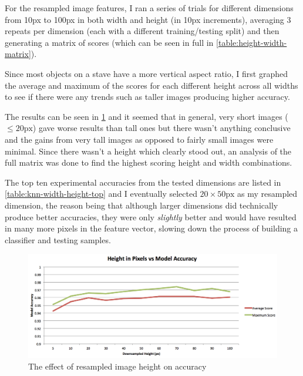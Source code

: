 For the resampled image features, I ran a series of trials for different dimensions from 10px to 100px in both width and height (in 10px increments), averaging 3 repeats per dimension (each with a different training/testing split) and then generating a matrix of scores (which can be seen in full in \cref{table:height-width-matrix}).

Since most objects on a stave have a more vertical aspect ratio, I first graphed the average and maximum of the scores for each different height across all widths to see if there were any trends such as taller images producing higher accuracy.

The results can be seen in \cref{fig:height-resample} and it seemed that in general, very short images ($\leq 20\text{px}$) gave worse results than tall ones but there wasn't anything conclusive and the gains from very tall images as opposed to fairly small images were minimal. Since there wasn't a height which clearly stood out, an analysis of the full matrix was done to find the highest scoring height and width combinations.

The top ten experimental accuracies from the tested dimensions are listed in \cref{table:knn-width-height-top} and I eventually selected $20\times50\text{px}$ as my resampled dimension, the reason being that although larger dimensions did technically produce better accuracies, they were only \emph{slightly} better and would have resulted in many more pixels in the feature vector, slowing down the process of building a classifier and testing samples.

\begin{figure}[H]
  \includegraphics[width=\linewidth]{gfx/techniques/downsampling-height-vs-accuracy.png}
  \caption{The effect of resampled image height on accuracy}
  \label{fig:height-resample}
\end{figure}

